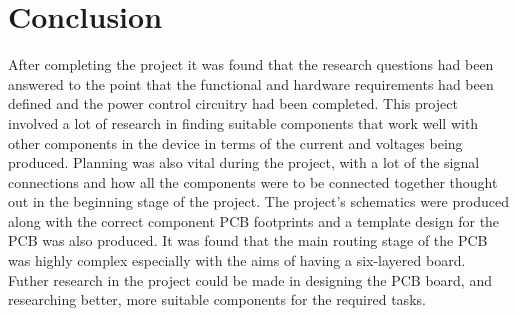 
\chapter{Conclusion} %

\label{Chapter8} %

	After completing the project it was found that the research questions had been answered to the point that the functional and hardware requirements had been defined and the power control circuitry had been completed. This project involved a lot of research in finding suitable components that work well with other components in the device in terms of the current and voltages being produced. Planning was also vital during the project, with a lot of the signal connections and how all the components were to be connected together thought out in the beginning stage of the project. The project's schematics were produced along with the correct component PCB footprints and a template design for the PCB was also produced. It was found that the main routing stage of the PCB was highly complex especially with the aims of having a six-layered board. \\
	Futher research in the project could be made in designing the PCB board, and researching better, more suitable components for the required tasks. 






